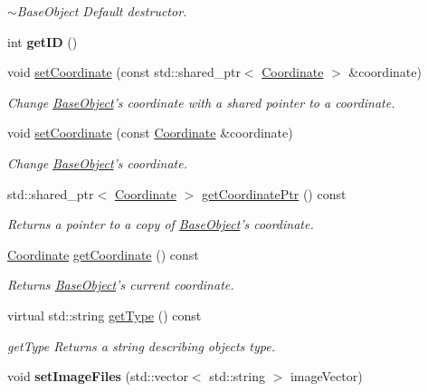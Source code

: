 \begin{DoxyCompactItemize}
\begin{DoxyCompactList}\small\item\em $\sim$\-Base\-Object Default destructor. \end{DoxyCompactList}\item 
\hypertarget{class_course_1_1_base_object_ade45146ca96d06a38f964cefbb6b13cf}{int {\bfseries get\-I\-D} ()}\label{class_course_1_1_base_object_ade45146ca96d06a38f964cefbb6b13cf}

\item 
void \hyperlink{class_course_1_1_base_object_a32923f23246f3cf3f079e168acb1a068}{set\-Coordinate} (const std\-::shared\-\_\-ptr$<$ \hyperlink{class_course_1_1_coordinate}{Coordinate} $>$ \&coordinate)
\begin{DoxyCompactList}\small\item\em Change \hyperlink{class_course_1_1_base_object}{Base\-Object}'s coordinate with a shared pointer to a coordinate. \end{DoxyCompactList}\item 
void \hyperlink{class_course_1_1_base_object_a11f86c5557e6ce3e8149c09a2923673d}{set\-Coordinate} (const \hyperlink{class_course_1_1_coordinate}{Coordinate} \&coordinate)
\begin{DoxyCompactList}\small\item\em Change \hyperlink{class_course_1_1_base_object}{Base\-Object}'s coordinate. \end{DoxyCompactList}\item 
std\-::shared\-\_\-ptr$<$ \hyperlink{class_course_1_1_coordinate}{Coordinate} $>$ \hyperlink{class_course_1_1_base_object_a92b314fdfb389031ad2561cd866dd5c1}{get\-Coordinate\-Ptr} () const 
\begin{DoxyCompactList}\small\item\em Returns a pointer to a copy of \hyperlink{class_course_1_1_base_object}{Base\-Object}'s coordinate. \end{DoxyCompactList}\item 
\hyperlink{class_course_1_1_coordinate}{Coordinate} \hyperlink{class_course_1_1_base_object_add84166c5a12a034cb958ece81ebc490}{get\-Coordinate} () const 
\begin{DoxyCompactList}\small\item\em Returns \hyperlink{class_course_1_1_base_object}{Base\-Object}'s current coordinate. \end{DoxyCompactList}\item 
virtual std\-::string \hyperlink{class_course_1_1_base_object_ae66880c372a67483fc4205a55839443a}{get\-Type} () const 
\begin{DoxyCompactList}\small\item\em get\-Type Returns a string describing objects type. \end{DoxyCompactList}\item 
\hypertarget{class_course_1_1_base_object_acbccc554d59c65d3e970aa5d8ce67814}{void {\bfseries set\-Image\-Files} (std\-::vector$<$ std\-::string $>$ image\-Vector)}\label{class_course_1_1_base_object_acbccc554d59c65d3e970aa5d8ce67814}


\end{DoxyCompactItemize}
